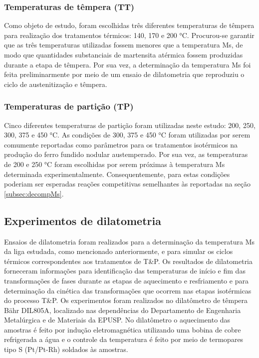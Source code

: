 
\subsubsection*{Temperaturas de t\^{e}mpera (TT)} 

Como objeto de estudo, foram escolhidas três diferentes temperaturas de têmpera para realização dos tratamentos térmicos: 140, 170 e 200 °C. Procurou-se garantir que as três temperaturas utilizadas fossem menores que a temperatura Ms, de modo que quantidades substanciais de martensita atérmica fossem produzidas durante a etapa de têmpera. Por sua vez, a determinação da temperatura Ms foi feita preliminarmente por meio de um ensaio de dilatometria que reproduziu o ciclo de austenitização e têmpera.

\subsubsection*{Temperaturas de parti\c{c}\~{a}o (TP)} 

Cinco diferentes temperaturas de partição foram utilizadas neste estudo: 200, 250, 300, 375 e 450 °C. As condições de 300, 375 e 450 °C foram utilizadas por serem comumente reportadas como parâmetros para os tratamentos isotérmicos na produção do ferro fundido nodular austemperado. %
Por sua vez, as temperaturas de 200 e 250 °C foram escolhidas por serem próximas à temperatura Ms determinada experimentalmente. Consequentemente, para estas condições poderiam ser esperadas reações competitivas semelhantes às reportadas na seção \ref{subsec:decompMs}.

\subsection{Experimentos de dilatometria}

\label{subsec:dilatometria}

Ensaios de dilatometria foram realizados para a determinação da temperatura Ms da liga estudada, como mencionado anteriormente, e para simular os ciclos térmicos correspondentes aos tratamentos de T\&P. Os resultados de dilatometria forneceram informações para identificação das temperaturas de início e fim das transformações de fases durante as etapas de aquecimento e resfriamento e para determinação da cinética das transformações que ocorrem nas etapas isotérmicas do processo T\&P. Os experimentos foram realizados no dilatômetro de têmpera Bähr DIL805A, localizado nas dependências do Departamento de Engenharia Metalúrgica e de Materiais da EPUSP. No dilatômetro o aquecimento das amostras é feito por indução eletromagnética utilizando uma bobina de cobre refrigerada a água e o controle da temperatura é feito por meio de termopares tipo S (Pt/Pt-Rh) soldados às amostras.


